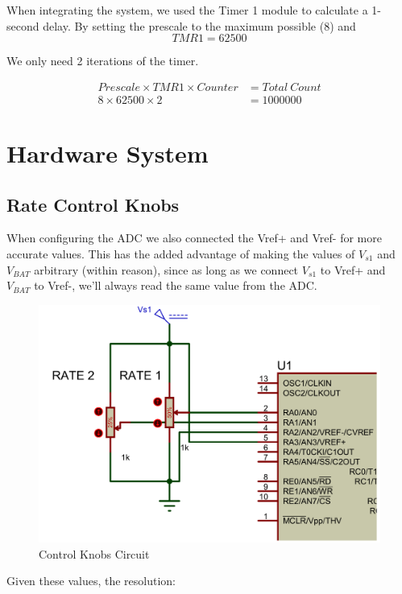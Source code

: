\documentclass[a4paper, 12pt]{article}
\begin{document}
\par
When integrating the system, we used the Timer 1 module to calculate a 1-second delay. By setting the prescale to the maximum possible (8) and
\begin{equation*}
	TMR1 = \num[group-separator={,}]{62500}
\end{equation*}


We only need 2 iterations of the timer. 

\begin{align*}
	Prescale \times TMR1 \times Counter &= Total \: Count  \\
	8 \times \num[group-separator={,}]{62500} \times 2 &= \num[group-separator={,}]{1000000}
\end{align*}

\newpage

\section{Hardware System}
\subsection{Rate Control Knobs}
When configuring the ADC we also connected the Vref+ and Vref- for more accurate values. 
This has the added advantage of making the values of $V_{s1}$ and $V_{BAT}$ arbitrary (within reason), since as long as we connect $V_{s1}$ to Vref+ and $V_{BAT}$ to Vref-, we’ll always read the same value from the ADC. 

\begin{figure}[H]
\centering
\includegraphics[width=0.8\linewidth]{images/ADC} %
\caption{Control Knobs Circuit}
\end{figure}

\par Given these values, the resolution:
\end{document}
